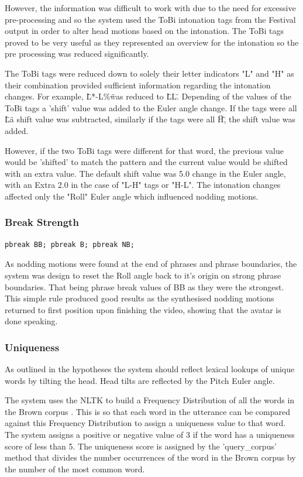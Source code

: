 \documentclass[bsc,frontabs,twoside,singlespacing,parskip]{infthesis}
\begin{document}
However, the information was difficult to work with due to the need for excessive pre-processing and so the system used the ToBi intonation tags from the Festival output in order to alter head motions based on the intonation. The ToBi tags proved to be very useful as they represented an overview for the intonation so the pre processing was reduced significantly.

The ToBi tags were reduced down to solely their letter indicators "L" and "H" as their combination provided sufficient information regarding the intonation changes. For example, \"L*-L\%\" was reduced to \"LL\". Depending of the values of the ToBi tags a 'shift' value was added to the Euler angle change. If the tags were all \"L\" a shift value was subtracted, similarly if the tags were all \"H\", the shift value was added. 

However, if the two ToBi tags were different for that word, the previous value would be 'shifted' to match the pattern and the current value would be shifted with an extra value. The default shift value was 5.0 change in the Euler angle, with an Extra 2.0 in the case of "L-H" tags or "H-L". The intonation changes affected only the "Roll" Euler angle which influenced nodding motions.

\subsubsection{Break Strength}

\begin{lstlisting}
pbreak BB; pbreak B; pbreak NB;
\end{lstlisting}

As nodding motions were found at the end of phrases and phrase boundaries, the system was design to reset the Roll angle back to it's origin on strong phrase boundaries. That being phrase break values of BB as they were the strongest. This simple rule produced good results as the synthesised nodding motions returned to first position upon finishing the video, showing that the avatar is done speaking.

\subsubsection{Uniqueness}

As outlined in the hypotheses the system should reflect lexical lookups of unique words by tilting the head. Head tilts are reflected by the Pitch Euler angle.

The system uses the NLTK \cite{nltk} to build a Frequency Distribution of all the words in the Brown corpus \cite{brown}. This is so that each word in the utterance can be compared against this Frequency Distribution to assign a uniqueness value to that word. The system assigns a positive or negative value of 3 if the word has a uniqueness score of less than 5. The uniqueness score is assigned by the 'query\_corpus' method that divides the number occurrences of the word in the Brown corpus by the number of the most common word.
\end{document}
